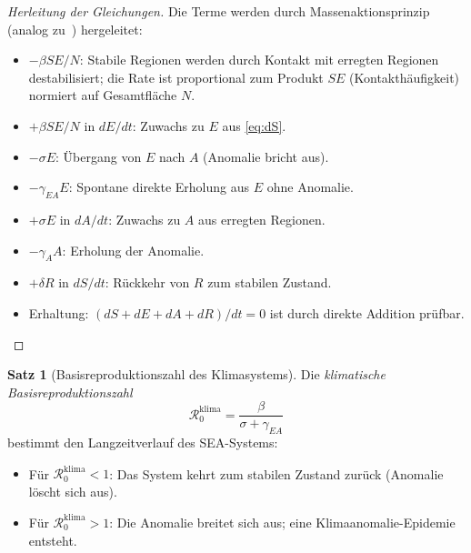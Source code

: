 ﻿\documentclass[a4paper,12pt]{article}
\theoremstyle{definition}
\newtheorem{satz}{Satz}
\begin{document}
\begin{proof}[Herleitung der Gleichungen]
Die Terme werden durch Massenaktionsprinzip (analog zu~\cite{epp2026r0}) hergeleitet:
\begin{itemize}
    \item $-\beta SE/N$: Stabile Regionen werden durch Kontakt mit erregten Regionen
          destabilisiert; die Rate ist proportional zum Produkt $SE$ (Kontakth\"aufigkeit)
          normiert auf Gesamtfl\"ache $N$.
    \item $+\beta SE/N$ in $dE/dt$: Zuwachs zu $E$ aus \eqref{eq:dS}.
    \item $-\sigma E$: \"Ubergang von $E$ nach $A$ (Anomalie bricht aus).
    \item $-\gamma_{EA} E$: Spontane direkte Erholung aus $E$ ohne Anomalie.
    \item $+\sigma E$ in $dA/dt$: Zuwachs zu $A$ aus erregten Regionen.
    \item $-\gamma_A A$: Erholung der Anomalie.
    \item $+\delta R$ in $dS/dt$: R\"uckkehr von $R$ zum stabilen Zustand.
    \item Erhaltung: $(dS+dE+dA+dR)/dt = 0$ ist durch direkte Addition pr\"ufbar.
\end{itemize}
\end{proof}

\begin{satz}[Basisreproduktionszahl des Klimasystems]
\label{satz:r0_sea}
Die \emph{klimatische Basisreproduktionszahl}
\[
\mathcal{R}_0^{\mathrm{klima}} = \frac{\beta}{\sigma + \gamma_{EA}}
\]
bestimmt den Langzeitverlauf des SEA-Systems:
\begin{itemize}
    \item F\"ur $\mathcal{R}_0^{\mathrm{klima}} < 1$: Das System kehrt zum stabilen
          Zustand zur\"uck (Anomalie l\"oscht sich aus).
    \item F\"ur $\mathcal{R}_0^{\mathrm{klima}} > 1$: Die Anomalie breitet sich
          aus; eine Klimaanomalie-Epidemie entsteht.
\end{itemize}
\end{satz}
\end{document}

